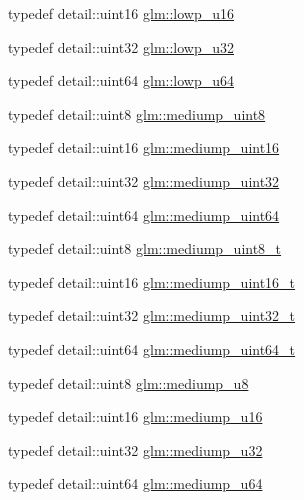 \begin{DoxyCompactItemize}
typedef detail\-::uint16 \hyperlink{group__gtc__type__precision_ga22c5364f27caa0a6eb0627cbc21e46be}{glm\-::lowp\-\_\-u16}
\item 
typedef detail\-::uint32 \hyperlink{group__gtc__type__precision_gaba06fae1dd98ca50c017e68345df0365}{glm\-::lowp\-\_\-u32}
\item 
typedef detail\-::uint64 \hyperlink{group__gtc__type__precision_ga61ed4c68a4cffb77cd63cc107119123a}{glm\-::lowp\-\_\-u64}
\item 
typedef detail\-::uint8 \hyperlink{group__gtc__type__precision_gac4b849eaac0543a10f97f4bdda4850a8}{glm\-::mediump\-\_\-uint8}
\item 
typedef detail\-::uint16 \hyperlink{group__gtc__type__precision_ga2cef3a0d7b0fce75c9885f64656d8933}{glm\-::mediump\-\_\-uint16}
\item 
typedef detail\-::uint32 \hyperlink{group__gtc__type__precision_ga861dbd1051f488e425b3966001b568e5}{glm\-::mediump\-\_\-uint32}
\item 
typedef detail\-::uint64 \hyperlink{group__gtc__type__precision_ga6685788d15d0a973ee7c2460d0456dc1}{glm\-::mediump\-\_\-uint64}
\item 
typedef detail\-::uint8 \hyperlink{group__gtc__type__precision_gadfa38f3c245d371c4b2079f1fd68928b}{glm\-::mediump\-\_\-uint8\-\_\-t}
\item 
typedef detail\-::uint16 \hyperlink{group__gtc__type__precision_ga0b385466deac5ac96061ef2cdd6db20f}{glm\-::mediump\-\_\-uint16\-\_\-t}
\item 
typedef detail\-::uint32 \hyperlink{group__gtc__type__precision_gac7782c1e393f9ad47e41a177a685f287}{glm\-::mediump\-\_\-uint32\-\_\-t}
\item 
typedef detail\-::uint64 \hyperlink{group__gtc__type__precision_gaa97354d3120a6dc029a5e9563723de18}{glm\-::mediump\-\_\-uint64\-\_\-t}
\item 
typedef detail\-::uint8 \hyperlink{group__gtc__type__precision_gac04b372784392e82bd557f300c4de097}{glm\-::mediump\-\_\-u8}
\item 
typedef detail\-::uint16 \hyperlink{group__gtc__type__precision_ga6745262ef6a6fdb8637b2387ef924828}{glm\-::mediump\-\_\-u16}
\item 
typedef detail\-::uint32 \hyperlink{group__gtc__type__precision_gad0c27a525045c299a92306eb4cd7c13a}{glm\-::mediump\-\_\-u32}
\item 
typedef detail\-::uint64 \hyperlink{group__gtc__type__precision_ga00c51a16fa190b0a90205d50d6d8a44a}{glm\-::mediump\-\_\-u64}
\item 

\end{DoxyCompactItemize}
